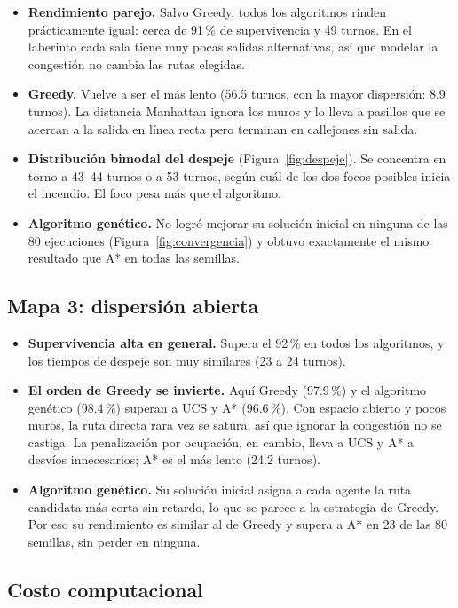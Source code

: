 \documentclass[11pt,a4paper]{article}
\begin{document}
\begin{itemize}
    \item \textbf{Rendimiento parejo.} Salvo Greedy, todos los algoritmos rinden prácticamente igual: cerca de 91\,\% de supervivencia y 49 turnos. En el laberinto cada sala tiene muy pocas salidas alternativas, así que modelar la congestión no cambia las rutas elegidas.
    \item \textbf{Greedy.} Vuelve a ser el más lento (56.5 turnos, con la mayor dispersión: 8.9 turnos). La distancia Manhattan ignora los muros y lo lleva a pasillos que se acercan a la salida en línea recta pero terminan en callejones sin salida.
    \item \textbf{Distribución bimodal del despeje} (Figura~\ref{fig:despeje}). Se concentra en torno a 43--44 turnos o a 53 turnos, según cuál de los dos focos posibles inicia el incendio. El foco pesa más que el algoritmo.
    \item \textbf{Algoritmo genético.} No logró mejorar su solución inicial en ninguna de las 80 ejecuciones (Figura~\ref{fig:convergencia}) y obtuvo exactamente el mismo resultado que A* en todas las semillas.
\end{itemize}

\subsection{Mapa 3: dispersión abierta}

\begin{itemize}
    \item \textbf{Supervivencia alta en general.} Supera el 92\,\% en todos los algoritmos, y los tiempos de despeje son muy similares (23 a 24 turnos).
    \item \textbf{El orden de Greedy se invierte.} Aquí Greedy (97.9\,\%) y el algoritmo genético (98.4\,\%) superan a UCS y A* (96.6\,\%). Con espacio abierto y pocos muros, la ruta directa rara vez se satura, así que ignorar la congestión no se castiga. La penalización por ocupación, en cambio, lleva a UCS y A* a desvíos innecesarios; A* es el más lento (24.2 turnos).
    \item \textbf{Algoritmo genético.} Su solución inicial asigna a cada agente la ruta candidata más corta sin retardo, lo que se parece a la estrategia de Greedy. Por eso su rendimiento es similar al de Greedy y supera a A* en 23 de las 80 semillas, sin perder en ninguna.
\end{itemize}

\subsection{Costo computacional}
\end{document}
